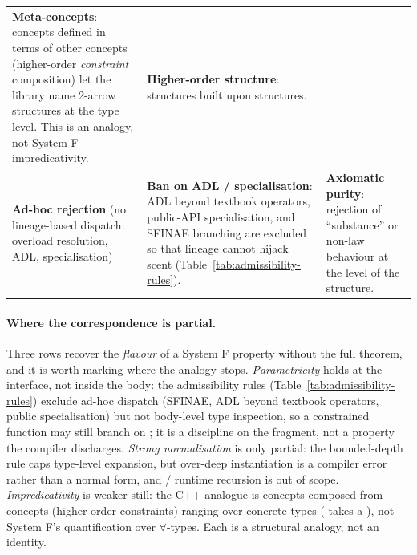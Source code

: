 \documentclass[11pt, a4paper]{article}
\begin{document}
\begin{landscape}
\begin{table}[p]
\begin{tabular}{@{}p{}p{}p{}@{}}
\textbf{Meta-concepts}: concepts defined in terms of other concepts (higher-order \emph{constraint} composition) let the library name 2-arrow structures at the type level.  This is an analogy, not System F impredicativity. &
\textbf{Higher-order structure}: structures built upon structures. \\ \addlinespace
\textbf{Ad-hoc rejection} (no lineage-based dispatch: overload resolution, ADL, specialisation) &
\textbf{Ban on ADL / specialisation}: ADL beyond textbook operators, public-API specialisation, and SFINAE branching are excluded so that lineage cannot hijack scent (Table~\ref{tab:admissibility-rules}). &
\textbf{Axiomatic purity}: rejection of ``substance'' or non-law behaviour at the level of the structure. \\ \bottomrule
\end{tabular}
\end{table}
\end{landscape}

\paragraph{Where the correspondence is partial.}
Three rows recover the \emph{flavour} of a System F property without the full theorem, and it is worth marking where the analogy stops.
\emph{Parametricity} holds at the interface, not inside the body: the admissibility rules (Table~\ref{tab:admissibility-rules}) exclude ad-hoc dispatch (SFINAE, ADL beyond textbook operators, public specialisation) but not body-level type inspection, so a constrained function may still branch on ; it is a discipline on the fragment, not a property the compiler discharges.
\emph{Strong normalisation} is only partial: the bounded-depth rule caps type-level expansion, but over-deep instantiation is a compiler error rather than a normal form, and  / runtime recursion is out of scope.
\emph{Impredicativity} is weaker still: the C++ analogue is concepts composed from concepts (higher-order constraints) ranging over concrete types ( takes a ), not System F's quantification over $\forall$-types.
Each is a structural analogy, not an identity.
\end{document}
